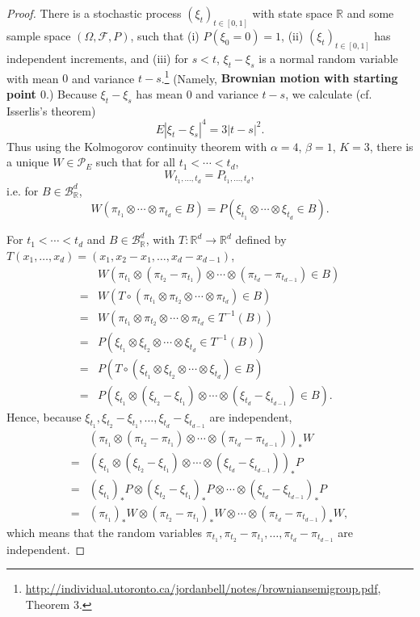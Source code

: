 \documentclass{article}
\theoremstyle{definition}
\begin{document}
\begin{proof}
There is a stochastic process $(\xi_t)_{t \in [0,1]}$ with state space $\mathbb{R}$ and some sample space $(\Omega,\mathscr{F},P)$, 
such that (i) $P(\xi_0=0)=1$, (ii)  $(\xi_t)_{t \in [0,1]}$ has independent increments, and (iii) for $s < t$, $\xi_t-\xi_s$ is a normal
random variable with mean $0$ and variance $t-s$.\footnote{\url{http://individual.utoronto.ca/jordanbell/notes/browniansemigroup.pdf}, Theorem 3.}
(Namely,
\textbf{Brownian motion with starting point $0$}.)
Because $\xi_t-\xi_s$ has mean $0$ and variance $t-s$, we calculate (cf. Isserlis's theorem)
\[
E|\xi_t-\xi_s|^4 = 3|t-s|^2.
\]
Thus using the Kolmogorov continuity theorem with $\alpha=4$, $\beta=1$, $K=3$, 
there is a unique $W \in \mathscr{P}_E$ such that for all $t_1<\cdots<t_d$,
\[
W_{t_1,\ldots,t_d} = P_{t_1,\ldots,t_d},
\]
i.e. for $B \in \mathscr{B}_{\mathbb{R}}^d$,
\[
W(\pi_{t_1} \otimes \cdots \otimes \pi_{t_d} \in B)
= P(\xi_{t_1} \otimes  \cdots \otimes \xi_{t_d} \in B).
\]

For $t_1<\cdots<t_d$ and $B \in \mathscr{B}_{\mathbb{R}}^d$, with $T:\mathbb{R}^d \to \mathbb{R}^d$
defined by $T(x_1,\ldots,x_d) = (x_1,x_2-x_1,\ldots,x_d-x_{d-1})$,
\[
\begin{split}
&W( \pi_{t_1} \otimes (\pi_{t_2}-\pi_{t_1}) \otimes \cdots \otimes (\pi_{t_d}-\pi_{t_{d-1}}) \in B)\\
=&W(T \circ (\pi_{t_1} \otimes \pi_{t_2} \otimes \cdots \otimes \pi_{t_d}) \in B)\\
=&W(\pi_{t_1} \otimes \pi_{t_2} \otimes \cdots \otimes \pi_{t_d} \in T^{-1}(B))\\
=&P(\xi_{t_1} \otimes \xi_{t_2} \otimes \cdots \otimes \xi_{t_d} \in T^{-1}(B))\\
=&P(T \circ (\xi_{t_1} \otimes \xi_{t_2} \otimes \cdots \otimes \xi_{t_d}) \in B)\\
=&P(\xi_{t_1} \otimes (\xi_{t_2}-\xi_{t_1}) \otimes \cdots \otimes (\xi_{t_d}-\xi_{t_{d-1}}) \in B).
\end{split}
\]
Hence, because $\xi_{t_1},\xi_{t_2}-\xi_{t_1},\ldots,\xi_{t_d}-\xi_{t_{d-1}}$ are independent,
\[
\begin{split}
&(\pi_{t_1} \otimes (\pi_{t_2}-\pi_{t_1}) \otimes \cdots \otimes (\pi_{t_d}-\pi_{t_{d-1}}))_* W\\
=&(\xi_{t_1} \otimes (\xi_{t_2}-\xi_{t_1}) \otimes \cdots \otimes (\xi_{t_d}-\xi_{t_{d-1}}))_*P\\
=&(\xi_{t_1})_*P \otimes (\xi_{t_2}-\xi_{t_1})_*P \otimes \cdots \otimes (\xi_{t_d}-\xi_{t_{d-1}})_*P\\
=&(\pi_{t_1})_*W \otimes (\pi_{t_2}-\pi_{t_1})_*W \otimes \cdots \otimes (\pi_{t_d}-\pi_{t_{d-1}})_*W,
\end{split}
\]
which means that the random variables $\pi_{t_1},\pi_{t_2}-\pi_{t_1},\ldots,\pi_{t_d}-\pi_{t_{d-1}}$ are independent. 


\end{proof}
\end{document}
